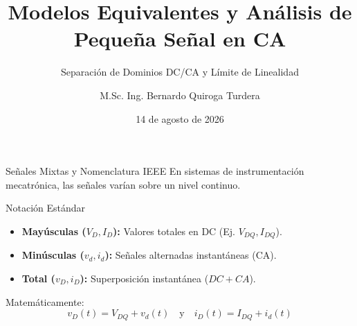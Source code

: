 \documentclass[10pt, aspectratio=169]{beamer}
\title[Modelos y Pequeña Señal]{Modelos Equivalentes y Análisis de Pequeña Señal en CA}
\subtitle{Separación de Dominios DC/CA y Límite de Linealidad}
\author{M.Sc. Ing. Bernardo Quiroga Turdera}
\institute[UCB Tarija]{Circuitos Electrónicos III (IMT-221)}
\date{14 de agosto de 2026}
\begin{document}
\begin{frame}
  \titlepage
\end{frame}

\begin{frame}{Señales Mixtas y Nomenclatura IEEE}
  En sistemas de instrumentación mecatrónica, las señales varían sobre un nivel continuo.
  \begin{block}{Notación Estándar}
    \begin{itemize}
        \item \textbf{Mayúsculas ($V_D, I_D$):} Valores totales en DC (Ej. $V_{DQ}, I_{DQ}$).
        \item \textbf{Minúsculas ($v_d, i_d$):} Señales alternadas instantáneas (CA).
        \item \textbf{Total ($v_D, i_D$):} Superposición instantánea ($DC + CA$).
    \end{itemize}
  \end{block}
  \vspace{0.2cm}
  Matemáticamente:
  \begin{equation*}
      v_D(t) = V_{DQ} + v_d(t) \quad \text{y} \quad i_D(t) = I_{DQ} + i_d(t)
  \end{equation*}
\end{frame}
\end{document}
